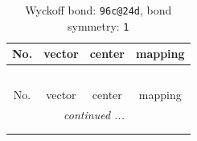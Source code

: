 \documentclass[fleqn,8pt]{jsarticle}
\begin{document}
\renewcommand{\arraystretch}{1.2}
\begin{longtable}{cccc}
\caption{Wyckoff bond: {\tt 96c@24d}, bond symmetry: {\tt 1}}
 \\
 \hline \hline
No. & vector & center & mapping \\ \hline \endfirsthead

\multicolumn{3}{l}{\tablename\ \thetable{}} \\
 \hline \hline
No. & vector & center & mapping \\ \hline \endhead

 \hline \hline
\multicolumn{3}{r}{\footnotesize\it continued ...} \\ \endfoot

 \hline \hline
\multicolumn{3}{r}{} \\ \endlastfoot


\end{longtable}
\end{document}
